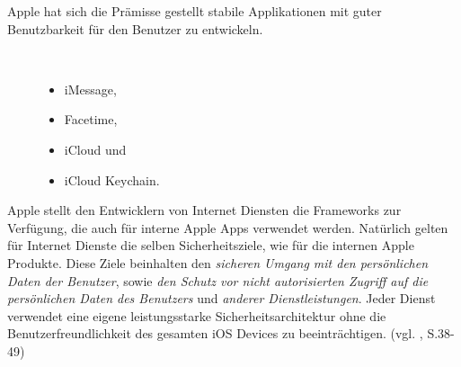 Apple hat sich die Prämisse gestellt stabile Applikationen mit guter Benutzbarkeit für den Benutzer zu entwickeln. 
\begin{description}
    \item[\parbox{\textwidth} {Beispiele für solche internen iOS Apps sind }]~\par
    \begin{itemize}
       \item iMessage,
       \item Facetime,
       \item iCloud und 
       \item iCloud Keychain.
    \end{itemize}
\end{description} 

Apple stellt den Entwicklern von Internet Diensten die Frameworks zur Verfügung, die auch für interne Apple Apps verwendet werden. Natürlich gelten für Internet Dienste die selben Sicherheitsziele, wie für die internen Apple Produkte. Diese Ziele beinhalten den \textit{\glqq sicheren Umgang mit den persönlichen Daten der Benutzer\grqq{}}, sowie \textit{\glqq den Schutz vor nicht autorisierten Zugriff auf die persönlichen Daten des Benutzers\grqq{}} und \textit{\glqq anderer Dienstleistungen\grqq{}}. Jeder Dienst verwendet eine eigene leistungsstarke Sicherheitsarchitektur ohne die Benutzerfreundlichkeit des gesamten iOS Devices zu beeinträchtigen. (vgl. \cite{Apple[4]}, S.38-49)

